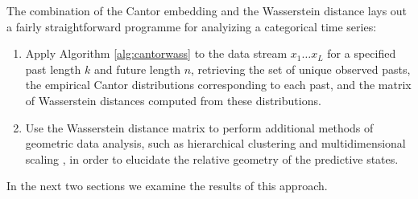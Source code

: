 \documentclass[sigconf, anonymous, review]{acmart}
\begin{document}
The combination of the Cantor embedding and the Wasserstein distance lays out a
fairly straightforward programme for analyizing a categorical time series:
\begin{enumerate}
  \item Apply Algorithm \ref{alg:cantorwass} to the data stream $x_1\dots x_L$
  for a specified past length $k$ and future length $n$, retrieving the set of
  unique observed pasts, the empirical Cantor distributions corresponding to
  each past, and the matrix of Wasserstein distances computed from these
  distributions.
  \item Use the Wasserstein distance matrix to perform additional methods of
  geometric data analysis, such as hierarchical clustering \cite{Mull11a} and
  multidimensional scaling \cite{Borg05a}, in order to elucidate the relative
  geometry of the predictive states.
\end{enumerate}
In the next two sections we examine the results of this approach.
\end{document}
